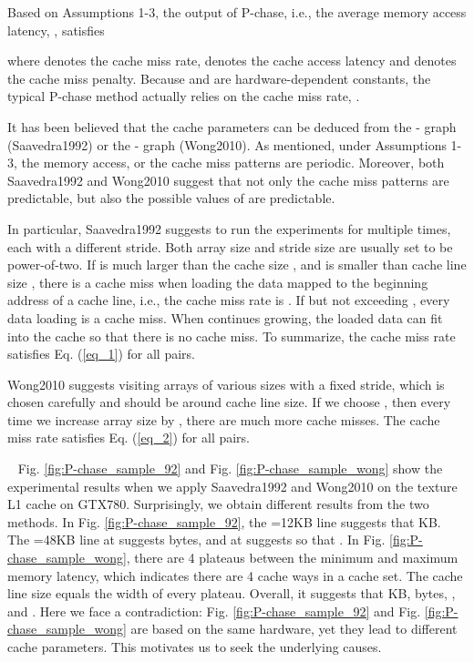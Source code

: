 \documentclass[10pt,journal,compsoc]{IEEEtran}
\theoremstyle{definition}
\begin{document}
Based on Assumptions 1-3, the output of P-chase, i.e., the average memory access latency, , satisfies

where  denotes the cache miss rate,  denotes the cache access latency and  denotes the cache miss penalty. Because  and  are hardware-dependent constants, the typical P-chase method actually relies on the cache miss rate, .

It has been believed that the cache parameters can be deduced from the - graph (Saavedra1992) or the - graph (Wong2010). As mentioned, under Assumptions 1-3, the memory access, or the cache miss patterns are periodic. Moreover, both Saavedra1992 and Wong2010 suggest that not only the cache miss patterns are predictable, but also the possible values of  are predictable.

In particular, Saavedra1992 suggests to run the experiments for multiple times, each with a different stride. Both array size  and stride size  are usually set to be power-of-two. If  is much larger than the cache size , and  is smaller than cache line size , there is a cache miss when loading the data mapped to the beginning address of a cache line, i.e., the cache miss rate is . If  but not exceeding , every data loading is a cache miss. When  continues growing, the loaded data can fit into the cache so that there is no cache miss. To summarize, the cache miss rate satisfies Eq. (\ref{eq_1}) for all  pairs.

Wong2010 suggests visiting arrays of various sizes with a fixed stride, which is chosen carefully and should be around cache line size. If we choose , then every time we increase array size by , there are much more cache misses. The cache miss rate satisfies Eq. (\ref{eq_2}) for all  pairs.

~
Fig. \ref{fig:P-chase_sample_92} and Fig. \ref{fig:P-chase_sample_wong} show the experimental results when we apply Saavedra1992 and Wong2010 on the texture L1 cache on GTX780. Surprisingly, we obtain different results from the two methods. In Fig. \ref{fig:P-chase_sample_92}, the =12KB line suggests that  KB. The =48KB line at  suggests  bytes, and at  suggests  so that . In Fig. \ref{fig:P-chase_sample_wong}, there are 4 plateaus between the minimum and maximum memory latency, which indicates there are 4 cache ways in a cache set. The cache line size equals the width of every plateau. Overall, it suggests that  KB,  bytes, , and . Here we face a contradiction: Fig. \ref{fig:P-chase_sample_92} and Fig. \ref{fig:P-chase_sample_wong} are based on the same hardware, yet they lead to different cache parameters. This motivates us to seek the underlying causes.
\end{document}
